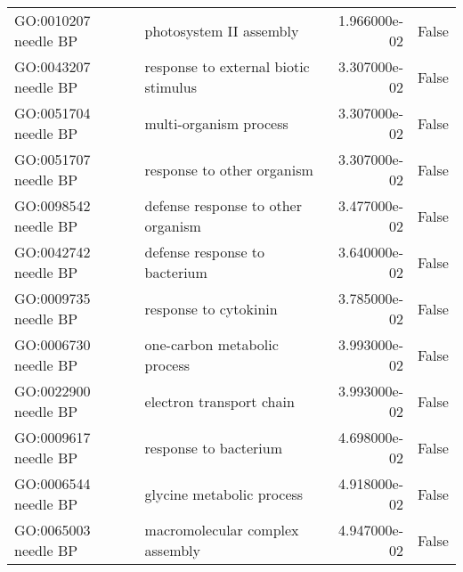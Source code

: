 \begin{tabular}{llrl}
GO:0010207 needle BP       &                      photosystem II assembly &   1.966000e-02 &  False \\
GO:0043207 needle BP       &         response to external biotic stimulus &   3.307000e-02 &  False \\
GO:0051704 needle BP       &                       multi-organism process &   3.307000e-02 &  False \\
GO:0051707 needle BP       &                   response to other organism &   3.307000e-02 &  False \\
GO:0098542 needle BP       &           defense response to other organism &   3.477000e-02 &  False \\
GO:0042742 needle BP       &                defense response to bacterium &   3.640000e-02 &  False \\
GO:0009735 needle BP       &                        response to cytokinin &   3.785000e-02 &  False \\
GO:0006730 needle BP       &                 one-carbon metabolic process &   3.993000e-02 &  False \\
GO:0022900 needle BP       &                     electron transport chain &   3.993000e-02 &  False \\
GO:0009617 needle BP       &                        response to bacterium &   4.698000e-02 &  False \\
GO:0006544 needle BP       &                    glycine metabolic process &   4.918000e-02 &  False \\
GO:0065003 needle BP       &              macromolecular complex assembly &   4.947000e-02 &  False \\
\bottomrule
\end{tabular}
